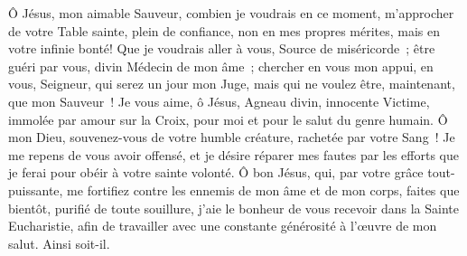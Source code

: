 
\par
{}














\vspace{7cm}

\begin{center}



\end{center}

\newpage
\fontsize{11.5}{13}\selectfont
\begin{center}\end{center}

Ô Jésus, mon aimable Sauveur, combien je voudrais en ce moment, m’approcher de votre Table sainte, plein de confiance, non en mes propres mérites, mais en votre infinie bonté! Que je voudrais aller à vous, Source de miséricorde~; être guéri par vous, divin Médecin de mon âme~; chercher en vous mon appui, en vous, Seigneur, qui serez un jour mon Juge, mais qui ne voulez être, maintenant, que mon Sauveur~! Je vous aime, ô Jésus, Agneau divin, innocente Victime, immolée par amour sur la Croix, pour moi et pour le salut du genre humain. Ô mon Dieu, souvenez-vous de votre humble créature, rachetée par votre Sang~! Je me repens de vous avoir offensé, et je désire réparer mes fautes par les efforts que je ferai pour obéir à votre sainte volonté. Ô bon Jésus, qui, par votre grâce tout-puissante, me fortifiez contre les ennemis de mon âme et de mon corps, faites que bientôt, purifié de toute souillure, j’aie le bonheur de vous recevoir dans la Sainte Eucharistie, afin de travailler avec une constante générosité à l’œuvre de mon salut. Ainsi soit-il.\par\vspace{0.2cm}
\begin{center}\end{center}

